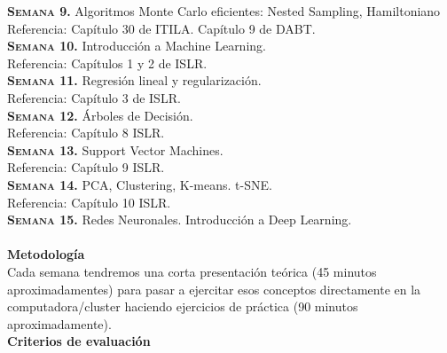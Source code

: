 \documentclass[letterpaper,10pt,onecolumn]{article}
\begin{document}
\noindent\textbf{\textsc{Semana 9.}}
Algoritmos Monte Carlo eficientes: Nested Sampling, Hamiltoniano\\
Referencia: Cap\'itulo 30 de ITILA. Cap\'itulo 9 de DABT.
\\[-0.3cm] 

\noindent\textbf{\textsc{Semana 10.}}  
Introducci\'on a Machine Learning. \\
Referencia: Cap\'itulos 1 y 2 de ISLR.
\\[-0.3cm] 

\noindent\textbf{\textsc{Semana 11.}}  
Regresi\'on lineal y regularizaci\'on.\\
Referencia: Cap\'itulo 3 de ISLR.
\\[-0.3cm]

\noindent\textbf{\textsc{Semana 12.}} 
\'Arboles de Decisi\'on.\\
Referencia: Cap\'itulo 8 ISLR. 
\\[-0.3cm]  

\noindent\textbf{\textsc{Semana 13.}} 
Support Vector Machines.\\
Referencia: Cap\'itulo 9 ISLR.
\\[-0.3cm] 

\noindent\textbf{\textsc{Semana 14.}} 
PCA, Clustering, K-means. t-SNE.\\
Referencia: Cap\'itulo 10 ISLR. 
\\[-0.3cm] 

\noindent\textbf{\textsc{Semana 15.}} 
Redes Neuronales. Introducci\'on a Deep Learning.\\
\\[-0.1cm]  


\noindent\textbf{\large {} \quad
  Metodolog\'ia}\\[-0.2cm] 


\noindent\normalsize Cada semana tendremos una corta presentaci\'on
te\'orica (45 minutos aproximadamentes) para pasar a ejercitar esos
conceptos directamente en la computadora/cluster haciendo
ejercicios de pr\'actica (90 minutos aproximadamente). \\[0.1cm]


\noindent\textbf{\large {} \quad Criterios de
  evaluaci\'on}\\[-0.2cm] 
\end{document}
